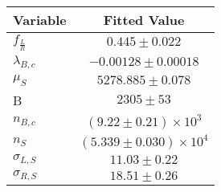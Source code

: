 \begin{tabular}[t]{lc}
\hline
Variable &Fitted Value\\
\hline\hline
$f_{\frac{L}{R}}$&$0.445\pm0.022$\\
\hline
$\lambda_{B,c}$&$-0.00128\pm0.00018$\\
\hline
$\mu_S$&$5278.885\pm0.078$\\
\hline
B&$2305\pm53$\\
\hline
$n_{B,c}$&$(9.22\pm0.21)\times 10^3$\\
\hline
$n_S$&$(5.339\pm0.030)\times 10^4$\\
\hline
$\sigma_{L, S}$&$11.03\pm0.22$\\
\hline
$\sigma_{R, S}$&$18.51\pm0.26$\\
\hline
\end{tabular}